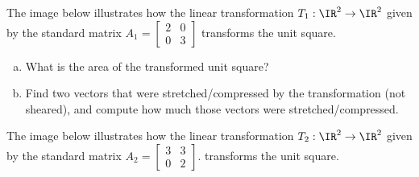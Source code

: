 


\begin{applicationActivities}{1}{25}

\begin{activity}{5}
The image below illustrates how the linear transformation
$T_1 : \IR^2 \rightarrow \IR^2$ given by the
standard matrix $A_1 = \begin{bmatrix} 2 & 0 \\ 0 & 3 \end{bmatrix}$
transforms the unit square.

\begin{center}
\end{center}

\begin{enumerate}[(a)]
\item What is the area of the transformed unit square?
\item Find two vectors that were stretched/compressed by the
      transformation (not sheared),
      and compute how much those vectors were stretched/compressed.
\end{enumerate}

\end{activity}


\begin{activity}{5}
The image below illustrates how the linear transformation
$T_2 : \IR^2 \rightarrow \IR^2$ given by the
standard matrix $A_2 = \begin{bmatrix} 3 & 3 \\ 0 & 2 \end{bmatrix}$.
transforms the unit square.


\end{activity}
\end{applicationActivities}
